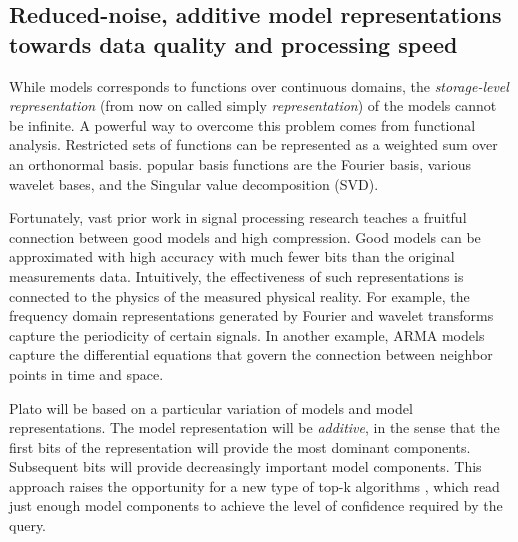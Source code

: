 \subsection{Reduced-noise, additive model representations towards data quality and processing speed}
\label{sec:reduced-noise-additive}

While models corresponds to functions over continuous domains, the
{\em storage-level representation} (from now on called simply {\em
  representation}) of the models cannot be infinite. A powerful way to
overcome this problem comes from functional analysis. Restricted sets
of functions can be represented as a weighted sum over an
orthonormal basis. popular basis functions are the Fourier basis,
various wavelet bases, and the Singular value decomposition (SVD).

Fortunately, vast prior work in signal processing research teaches a
fruitful connection between good models and high compression. Good
models can be approximated with high accuracy with much fewer bits
than the original measurements data. Intuitively, the effectiveness of
such representations is connected to the physics of the measured
physical reality. For example, the frequency domain representations
generated by Fourier and wavelet transforms capture the periodicity of
certain signals. In another example, ARMA models capture the
differential equations that govern the connection between neighbor
points in time and space.

Plato will be based on a particular variation of models and model representations. The model representation will be {\em additive}, in the sense that the first bits of the representation will provide the most dominant components. Subsequent bits will provide decreasingly important model components. This approach raises the opportunity for a new type of top-k algorithms \cite{Fagin}, which read just enough model components to achieve the level of confidence required by the query.

